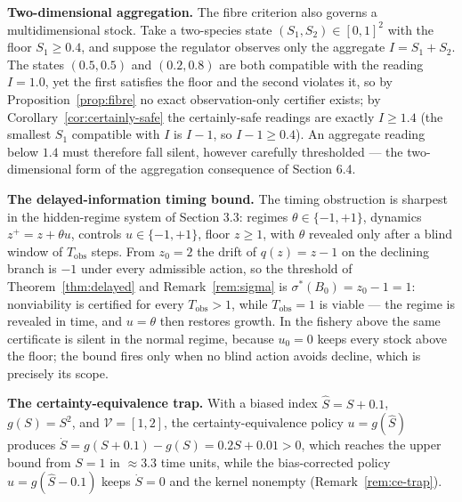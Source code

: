 \documentclass[10pt,twocolumn]{article}
\theoremstyle{definition}
\begin{document}
\textbf{Two-dimensional aggregation.} The fibre criterion also governs a multidimensional stock. Take a two-species state \((S_{1}, S_{2}) \in [0,1]^{2}\) with the floor \(S_{1} \ge 0.4\), and suppose the regulator observes only the aggregate \(I = S_{1} + S_{2}\). The states \((0.5, 0.5)\) and \((0.2, 0.8)\) are both compatible with the reading \(I = 1.0\), yet the first satisfies the floor and the second violates it, so by Proposition~\ref{prop:fibre} no exact observation-only certifier exists; by Corollary~\ref{cor:certainly-safe} the certainly-safe readings are exactly \(I \ge 1.4\) (the smallest \(S_{1}\) compatible with \(I\) is \(I - 1\), so \(I - 1 \ge 0.4\)). An aggregate reading below \(1.4\) must therefore fall silent, however carefully thresholded --- the two-dimensional form of the aggregation consequence of Section 6.4.

\textbf{The delayed-information timing bound.} The timing obstruction is sharpest in the hidden-regime system of Section 3.3: regimes \(\theta \in \{-1, +1\}\), dynamics \(z^{+} = z + \theta u\), controls \(u \in \{-1, +1\}\), floor \(z \ge 1\), with \(\theta\) revealed only after a blind window of \(T_{\mathrm{obs}}\) steps. From \(z_{0} = 2\) the drift of \(q(z) = z - 1\) on the declining branch is \(-1\) under every admissible action, so the threshold of Theorem~\ref{thm:delayed} and Remark~\ref{rem:sigma} is \(\sigma^{*}(B_{0}) = z_{0} - 1 = 1\): nonviability is certified for every \(T_{\mathrm{obs}} > 1\), while \(T_{\mathrm{obs}} = 1\) is viable --- the regime is revealed in time, and \(u = \theta\) then restores growth. In the fishery above the same certificate is silent in the normal regime, because \(u_{0} = 0\) keeps every stock above the floor; the bound fires only when no blind action avoids decline, which is precisely its scope.

\textbf{The certainty-equivalence trap.} With a biased index \(\hat{S} = S + 0.1\), \(g(S) = S^{2}\), and \(\mathcal{V} = [1,2]\), the certainty-equivalence policy \(u = g(\hat{S})\) produces \(\dot{S} = g(S+0.1) - g(S) = 0.2S + 0.01 > 0\), which reaches the upper bound from \(S = 1\) in \(\approx 3.3\) time units, while the bias-corrected policy \(u = g(\hat{S} - 0.1)\) keeps \(\dot{S} = 0\) and the kernel nonempty (Remark~\ref{rem:ce-trap}).
\end{document}
